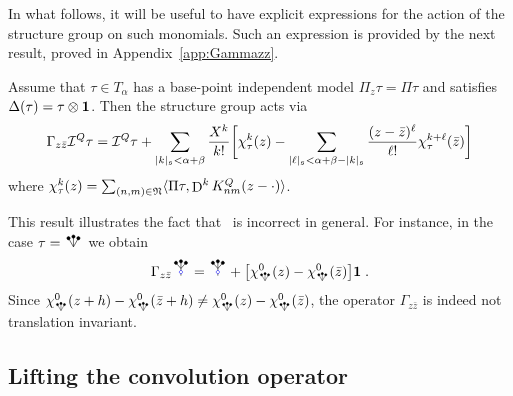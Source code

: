 \documentclass[reqno,11pt]{article}
\def\unit{\vone}
\def\abss#1{\abs{#1}_\mathfrak{s}}
\newcommand{\smallRSW}{\scalebox{0.7}{\RSW}}
\DeclareMathOperator{\D}{D}            %
\newcommand{\setnm}{\mathfrak{N}}
\newcommand{\sumnm}{\sum_{(n,m)\in\setnm}}
\begin{document}
In what follows, it will be useful to have explicit expressions for the action
of the structure group on such monomials. Such an expression is provided by the
next result, proved in Appendix~\ref{app:Gammazz}.

\begin{lemma}
\label{lem:Gammazz} 
Assume that $\tau\in T_\alpha$ has a base-point independent model
$\Pi_z\tau=\Pi\tau$ and satisfies $\Delta(\tau)=\tau\otimes\unit$. Then the
structure group acts via 
\begin{equation}
\Gamma_{z\bar z}\cI^Q\tau = \cI^Q\tau + 
\sum_{\abss{k}<\alpha+\beta}
\frac{X^k}{k!} 
\biggbrak{
 \chi_\tau^k(z) - \sum_{\abss{\ell} < \alpha+\beta-\abss{k}}
\frac{(z-\bar z)^\ell}{\ell!} \chi_\tau^{k+\ell}(\bar z)
}
\end{equation}
where $\chi_\tau^k(z) = \sumnm\pscal{\Pi\tau}{\D^k K^Q_{nm}(z-\cdot)}$.
\end{lemma}

\begin{remark}
This result illustrates the fact that~\cite[Lem.~4.8]{BK2016} is incorrect in
general. For instance, in the case $\tau=\RSW$ we obtain
\begin{equation}
 \Gamma_{z\bar z} \RSoIW = \RSoIW + \bigbrak{\chi^0_{\smallRSW}(z) -
\chi^0_{\smallRSW}(\bar z)}
\unit\;.
\label{eq:compute_Gamma2} 
\end{equation} 
Since $\chi^0_{\smallRSW}(z+h) - \chi^0_{\smallRSW}(\bar z+h) \neq
\chi^0_{\smallRSW}(z) - \chi^0_{\smallRSW}(\bar z)$, the operator
$\Gamma_{z\bar
z}$ is indeed not translation invariant. 
\end{remark}



\subsection{Lifting the convolution operator}
\end{document}
